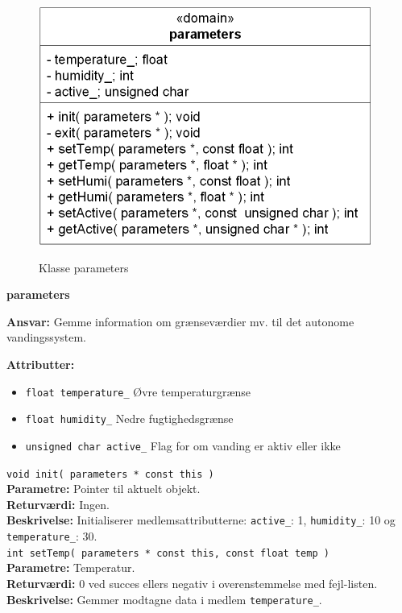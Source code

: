
\begin{figure}[htbp] \centering
{\includegraphics[scale=1.3]{filer/design/Klassediagrammer/sw_psoc_parameters}}
\caption{Klasse parameters}
\label{fig:sw_psoc_class_parameters}
\end{figure} 

{\centering
\textbf{parameters}\par
}
\textbf{Ansvar:} Gemme information om grænseværdier mv. til det autonome vandingssystem. \

\textbf{Attributter:}
\begin{itemize}
	\item \verb+float temperature_+ Øvre temperaturgrænse
	\item \verb+float humidity_+ Nedre fugtighedsgrænse
	\item \verb+unsigned char active_+ Flag for om vanding er aktiv eller ikke
\end{itemize}

\verb+void init( parameters * const this ) +\\
\textbf{Parametre:} Pointer til aktuelt objekt. \\
\textbf{Returværdi:} Ingen. \\
\textbf{Beskrivelse:} Initialiserer medlemsattributterne: \verb+active_+: 1, \verb+humidity_+: 10 og \verb+temperature_+: 30. \\

\verb+int setTemp( parameters * const this, const float temp ) +\\
\textbf{Parametre:} Temperatur. \\
\textbf{Returværdi:} 0 ved succes ellers negativ i overenstemmelse med fejl-listen. \\
\textbf{Beskrivelse:} Gemmer modtagne data i medlem \verb+temperature_+. \\

